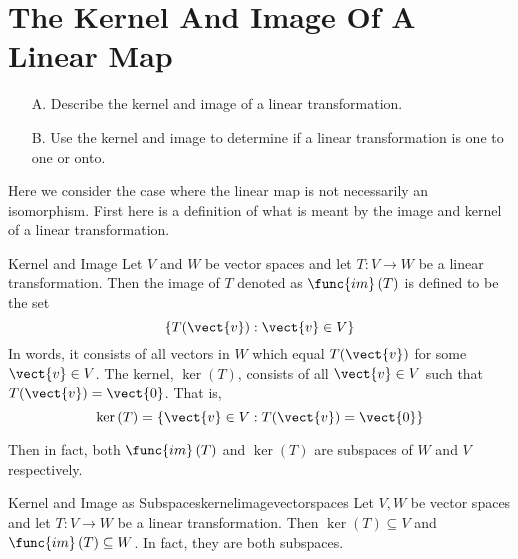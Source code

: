 \section{The Kernel And Image Of A Linear Map}

\begin{outcome}
\begin{enumerate}
\item[A.] Describe the kernel and image of a linear transformation.

\item[B.] Use the kernel and image to determine if a linear transformation is one to one or onto. 
\end{enumerate}
\end{outcome}

Here we consider the case where the linear map is not necessarily an
isomorphism. First here is a definition of what is meant by the image and
kernel of a linear transformation.

\begin{definition}{Kernel and Image}{}
Let $V$ and $W$ be vector spaces and let $T:V\rightarrow W$ be a linear transformation. Then the image of $T$
denoted as $\func{im}\left( T\right) $ is defined to be the set 
\begin{equation*}
\left\{ T(\vect{v}):\vect{v}\in V\right\}
\end{equation*}
In words, it consists of all vectors in $W$ which equal $T(\vect{v})$ for some $
\vect{v}\in V$. The kernel, $\ker \left( T\right) $, 
consists of all $\vect{v}\in V$ such that $T(\vect{v})=\vect{0}$. That is, 
\begin{equation*}
\ker \left( T\right) =\left\{ \vect{v}\in V:T(\vect{v})=\vect{0}\right\}
\end{equation*}
\end{definition}

Then in fact, both $\func{im}\left( T\right) $ and $\ker \left( T\right) $
are subspaces of $W$ and $V$ respectively.

\begin{proposition}{Kernel and Image as Subspaces}{kernelimagevectorspaces}
Let $V,W$ be vector spaces and let $T:V\rightarrow W$ be a linear transformation. Then $\ker \left(
T\right) \subseteq V$ and $\func{im}\left( T\right) \subseteq W$. In fact, they are both subspaces. 
\end{proposition}


